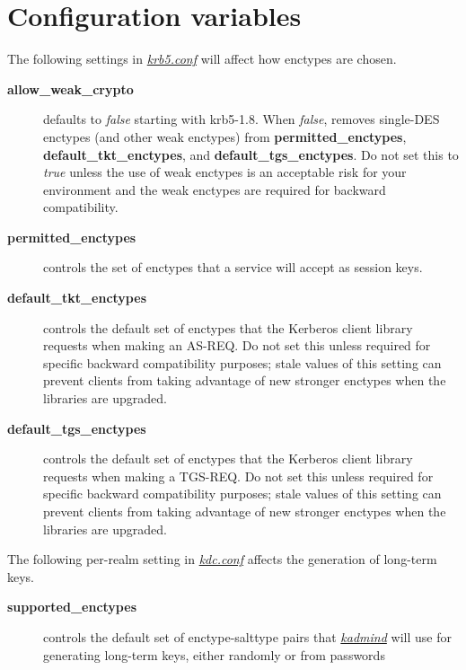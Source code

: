 \documentclass[letterpaper,10pt,english]{sphinxmanual}
\begin{document}
\section{Configuration variables}
\label{admin/enctypes:configuration-variables}
The following \code{{[}libdefaults{]}} settings in {\hyperref[admin/conf_files/krb5_conf:krb5-conf-5]{\emph{krb5.conf}}} will
affect how enctypes are chosen.
\begin{description}
\item[{\textbf{allow\_weak\_crypto}}] \leavevmode
defaults to \emph{false} starting with krb5-1.8.  When \emph{false}, removes
single-DES enctypes (and other weak enctypes) from
\textbf{permitted\_enctypes}, \textbf{default\_tkt\_enctypes}, and
\textbf{default\_tgs\_enctypes}.  Do not set this to \emph{true} unless the
use of weak enctypes is an acceptable risk for your environment
and the weak enctypes are required for backward compatibility.

\item[{\textbf{permitted\_enctypes}}] \leavevmode
controls the set of enctypes that a service will accept as session
keys.

\item[{\textbf{default\_tkt\_enctypes}}] \leavevmode
controls the default set of enctypes that the Kerberos client
library requests when making an AS-REQ.  Do not set this unless
required for specific backward compatibility purposes; stale
values of this setting can prevent clients from taking advantage
of new stronger enctypes when the libraries are upgraded.

\item[{\textbf{default\_tgs\_enctypes}}] \leavevmode
controls the default set of enctypes that the Kerberos client
library requests when making a TGS-REQ.  Do not set this unless
required for specific backward compatibility purposes; stale
values of this setting can prevent clients from taking advantage
of new stronger enctypes when the libraries are upgraded.

\end{description}

The following per-realm setting in {\hyperref[admin/conf_files/kdc_conf:kdc-conf-5]{\emph{kdc.conf}}} affects the
generation of long-term keys.
\begin{description}
\item[{\textbf{supported\_enctypes}}] \leavevmode
controls the default set of enctype-salttype pairs that {\hyperref[admin/admin_commands/kadmind:kadmind-8]{\emph{kadmind}}}
will use for generating long-term keys, either randomly or from
passwords

\end{description}
\end{document}
